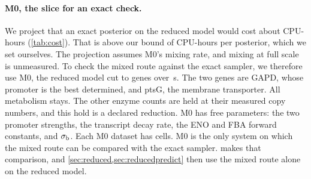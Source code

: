 \paragraph{M0, the slice for an exact check.} We project that an exact posterior on the
reduced model would cost about  CPU-hours (\cref{tab:cost}). That is above our bound of
 CPU-hours per posterior, which we set ourselves. The projection
assumes M0's mixing rate, and mixing at full scale is unmeasured. To check the mixed route against the
exact sampler, we therefore use M0, the reduced model cut to  genes over
\,s. The two genes are GAPD, whose promoter is the best determined, and
ptsG, the membrane transporter. All metabolism stays. The other enzyme counts are held at
their measured copy numbers, and this hold is a declared reduction. M0 has 
free parameters: the two promoter strengths, the transcript decay rate, the ENO and FBA
forward constants, and $\sigma_{\mathrm{b}}$. Each M0 dataset has  cells. M0 is the only
system on which the mixed route can be compared with the exact sampler.
 makes that comparison, and \cref{sec:reduced,sec:reducedpredict} then
use the mixed route alone on the reduced model.
